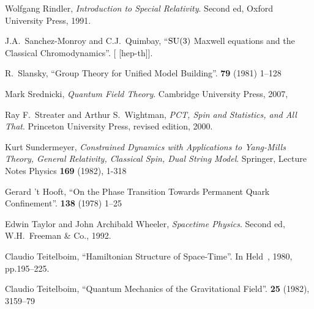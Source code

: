 \begin{thebibliography}{99}
Wolfgang Rindler,
\textit{Introduction to Special Relativity}.
Second ed, Oxford University Press, 1991.

  
J.A.~Sanchez-Monroy and C.J.~Quimbay,
``$\operatorname{SU}(3)$ Maxwell equations and the Classical Chromodynamics''.
[ [hep-th]].

R.~Slansky,
``Group Theory for Unified Model Building''.
 \textbf{79} (1981) 1--128
{\tt{}}

Mark Srednicki,
\textit{Quantum Field Theory}.
Cambridge University Press, 2007,
{\tt{}}

Ray F.~Streater and Arthur S.~Wightman,
\textit{PCT, Spin and Statistics, and All That}.
Princeton University Press, revised edition, 2000.

Kurt Sundermeyer,
\textit{Constrained Dynamics with Applications to Yang-Mills Theory, General Relativity, Classical Spin, Dual String Model}.
Springer, Lecture Notes Physics \textbf{169} (1982), 1-318



Gerard 't Hooft,
``On the Phase Transition Towards Permanent Quark Confinement''.
 \textbf{138} (1978) 1--25
{\tt{}}

Edwin Taylor and John Archibald Wheeler,
\textit{Spacetime Physics}.
Second ed, W.H.~Freeman \& Co., 1992.

Claudio Teitelboim,
``Hamiltonian Structure of Space-Time''.
In Held~\cite{Held:1980gb}, 1980, pp.195--225.

Claudio Teitelboim,
``Quantum Mechanics of the Gravitational Field''.
 \textbf{25} (1982), 3159--79
{\tt{}}


\end{thebibliography}
